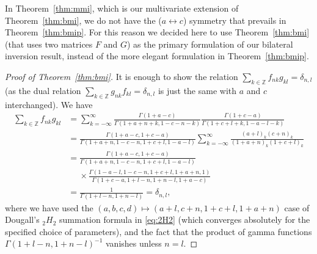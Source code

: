 \documentclass[reqno,12pt]{amsart}
\theoremstyle{remark}
\numberwithin{equation}{section}
\newcommand{\Ga}{\Gamma}
\newcommand{\Z}{\mathbb Z}
\begin{document}
In Theorem~\ref{thm:mmi}, which is our multivariate extension
of Theorem~\ref{thm:bmi},
we do not have the ($a\leftrightarrow c$) symmetry that prevails
in Theorem~\ref{thm:bmip}.
For this reason we decided here to use Theorem~\ref{thm:bmi}
(that uses two matrices $F$ and $G$) as the primary formulation
of our bilateral inversion result, instead of the more elegant
formulation in Theorem~\ref{thm:bmip}.
\begin{proof}[Proof of Theorem~\ref{thm:bmi}]
  It is enough to show the relation $\sum_{k\in\Z}f_{nk}g_{kl}=\delta_{n,l}$
  (as the dual relation $\sum_{k\in\Z}g_{nk}f_{kl}=\delta_{n,l}$ is
  just the same with $a$ and $c$ interchanged). We have
\begin{align*}
  \sum_{k\in\Z}f_{nk}g_{kl}
  &=\sum_{k=-\infty}^\infty\frac{\Ga(1+a-c)}
{\Ga(1+a+n+k,1-c-n-k)}\frac{\Ga(1+c-a)}{\Ga(1+c+l+k,1-a-l-k)}\\
  &=\frac{\Ga(1+a-c,1+c-a)}{\Ga(1+a+n,1-c-n,1+c+l,1-a-l)}
    \sum_{k=-\infty}^\infty\frac{(a+l)_k(c+n)_k}{(1+a+n)_k(1+c+l)_k}\\
  &=\frac{\Ga(1+a-c,1+c-a)}{\Ga(1+a+n,1-c-n,1+c+l,1-a-l)}\\
  &\quad\;\times\frac{\Ga(1-a-l,1-c-n,1+c+l,1+a+n,1)}
    {\Ga(1+c-a,1+l-n,1+n-l,1+a-c)}\\
  &=\frac 1{\Ga(1+l-n,1+n-l)}=\delta_{n,l},
\end{align*}
where we have used the $(a,b,c,d)\mapsto(a+l,c+n,1+c+l,1+a+n)$ case
of Dougall's $_2H_2$ summation formula in \eqref{eq:2H2}
(which converges absolutely for the specified choice of parameters),
and the fact that the product of gamma functions
$\Ga(1+l-n,1+n-l)^{-1}$ vanishes unless $n=l$.
\end{proof}
\end{document}
